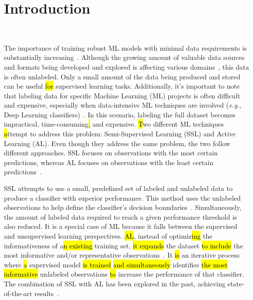 \documentclass[preprint, 12pt]{elsarticle}
\begin{document}
\linenumbers%

\section{Introduction}~\label{sec:introduction}


The importance of training robust ML models with minimal data requirements is
substantially increasing~\cite{Nath2021, Sverchkov2017, Li2012}. Although the
growing amount of valuable data sources and formats being developed and
explored is affecting various domains~\cite{Li2021}, this data is often
unlabeled. Only a small amount of the data being produced and stored can be
useful \hl{for} supervised learning tasks. Additionally, it's important to
note that labeling data for specific Machine Learning (ML) projects is often
difficult and expensive, especially when data-intensive ML techniques are
involved (\textit{e.g.,} Deep Learning classifiers)~\cite{Nath2021}. In this
scenario, labeling the full dataset becomes impractical, time-consuming\hl{,}
and expensive.  \hl{T}wo different ML techniques\hl{ a}ttempt to address this
problem: Semi-Supervised Learning (SSL) and Active Learning (AL). Even though
they address the same problem, the two follow different approaches. SSL
focuses on observations with the most certain predictions, whereas AL focuses
on observations with the least certain predictions~\cite{Simeoni2020}.

SSL attempts to use a small, predefined set of labeled and unlabeled data to
produce a classifier with superior performance. This method uses the unlabeled
observations to help define the classifier's decision
boundaries~\cite{Van2020}. Simultaneously, the amount of labeled data required
to reach a given performance threshold is also reduced. It is a special case
of ML because it falls between the supervised and unsupervised learning
perspectives. \hl{AL}, instead of optimiz\hl{ing} the informativeness of
a\hl{n existing} training set, \hl{it expands} the dataset \hl{to include} the
most informative and/or representative observations~\cite{Sener2018}. It
\hl{is} an iterative process where \hl{a} supervised model \hl{is trained}
\hl{and simultaneously} identifies \hl{the most informative} unlabeled
observations\hl{ to} increase the performance of that classifier. The
combination of SSL with AL has been explored in the past, achieving
state-of-the-art results~\cite{Leng2013}.
 
\end{document}
